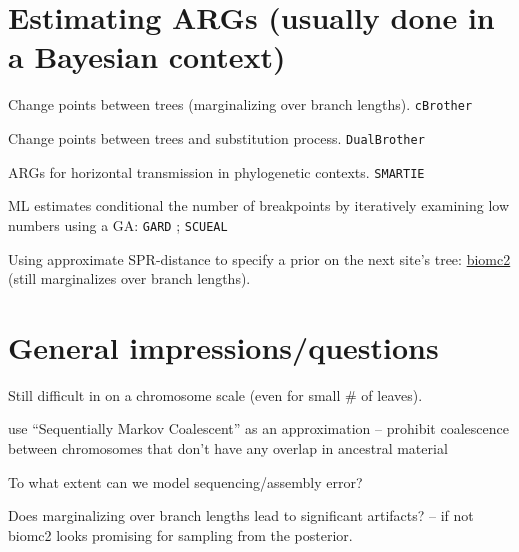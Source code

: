 \documentclass[landscape]{foils}
\begin{document}
\myNewSlide
\section*{Estimating ARGs  (usually done in a Bayesian context)}
\begin{compactitem}
	\item Change points between trees (marginalizing over branch lengths). {\tt cBrother} \citep{SuchardWDS2002,SuchardWDS2003,FangDMSD2007} 
	\item Change points between trees  and substitution process. {\tt DualBrother} \citep{MininDFS2005}
	\item ARGs for horizontal transmission in phylogenetic contexts. {\tt SMARTIE} \citep{BloomquistS2010}
	\item ML estimates conditional the number of breakpoints by iteratively examining low numbers using a GA: {\tt GARD} \citep{KosakovskyPondPGWF2006}; {\tt SCUEAL} \citep{KosakovsyPondEtAl2009}
	\item Using approximate SPR-distance to specify a prior on the next site's tree:  \href{http://www.biomcmc.org/software/biomc2}{biomc2} \citep{OliveiraMartinsLK2008,OliveiraMartinsK2010} (still marginalizes over branch lengths).
\end{compactitem}

\myNewSlide
\section*{General impressions/questions}
\begin{compactitem}
	\item Still difficult in on a chromosome scale (even for small \# of leaves).
	\item \citet{McVeanC2005} use ``Sequentially Markov Coalescent'' as an approximation -- prohibit coalescence between chromosomes that don't have any overlap in ancestral material
	\item To what extent can we model sequencing/assembly error?
	\item Does marginalizing over branch lengths lead to significant artifacts? -- if not biomc2 looks promising for sampling from the posterior.
\end{compactitem}
	


\small

\myNewSlide

\end{document}
